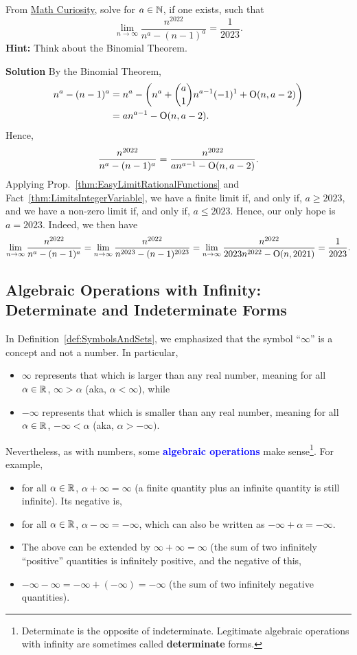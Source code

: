 \bigskip

\begin{example} From \href{https://youtu.be/dsr9ACtssHU}{Math Curiosity}, solve for $a\in \mathbb N$, if one exists, such that 
$$\lim_{n \to \infty} \frac{n^{2022}}{n^a-(n-1)^a} = \frac{1}{2023}.$$ 
\textbf{Hint:} Think about the Binomial Theorem.
    
\end{example}
\textbf{Solution}
By the Binomial Theorem, 
\begin{align*} 
   n^a-(n-1)^a & = n^a - \left( n^a +  \binom{a}{1} n^{a-1} (-1)^1 +\mathrm{O}(n,{a-2})\right) \\
   &= a n^{a-1} -\mathrm{O}(n,{a-2}).
\end{align*}
Hence, 
$$ \frac{n^{2022}}{n^a-(n-1)^a} =  \frac{n^{2022}}{a n^{a-1} -\mathrm{O}(n,{a-2})}.$$
Applying Prop.~\ref{thm:EasyLimitRationalFunctions} and Fact~\ref{thm:LimitsIntegerVariable}, we have a finite limit if, and only if, $a\ge 2023$, and we have a non-zero limit if, and only if, $a \le 2023$. Hence, our only hope is $a=2023$. Indeed, we then have 
$$\lim_{n \to \infty} \frac{n^{2022}}{n^a-(n-1)^a} =  \lim_{n \to \infty} \frac{n^{2022}}{n^{2023}-(n-1)^{2023}} = \lim_{n \to \infty} \frac{n^{2022}}{2023 n^{2022} -\mathrm{O}(n,{2021})} = \frac{1}{2023}.$$
\Qed

\subsection{Algebraic Operations with Infinity: Determinate and Indeterminate Forms}

In Definition~\ref{def:SymbolsAndSets}, we emphasized that the symbol ``$\infty$'' is a concept and not a number. In particular, 
\begin{itemize}
    \item $\infty$ represents that which is larger than any real number, meaning for all $\alpha \in \mathbb R$, $\infty > \alpha$ (aka, $\alpha  < \infty$), while
    \item $-\infty$ represents that which is smaller than any real number, meaning for all $\alpha  \in \mathbb R$, $-\infty < \alpha $ (aka, $\alpha > -\infty)$. 
\end{itemize}
Nevertheless, as with numbers, some \textcolor{blue}{\bf algebraic operations} make sense\footnote{Determinate is the opposite of indeterminate. Legitimate algebraic operations with infinity are sometimes called \textbf{determinate} forms.}. For example, 
\begin{itemize}
    \item for all $\alpha \in \mathbb R$, $\alpha + \infty = \infty$ (a finite quantity plus an infinite quantity is still infinite). Its negative is,
    \item for all $\alpha \in \mathbb R$, $\alpha - \infty = -\infty$, which can also be written as $ -\infty + \alpha = -\infty$.
    \item The above can be extended by $\infty + \infty = \infty$ (the sum of two infinitely ``positive'' quantities is infinitely positive, and the negative of this,
    \item  $-\infty - \infty = -\infty + (- \infty) = -\infty$ (the sum of two infinitely negative quantities). 
\end{itemize}

